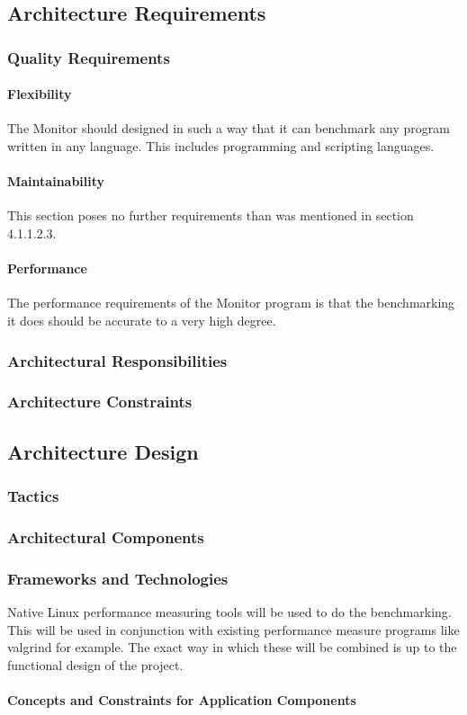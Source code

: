 
\subsection{Architecture Requirements}


\subsubsection{Quality Requirements}
\paragraph{Flexibility}
The Monitor should designed in such a way that it can benchmark any program
written in any language. This includes programming and scripting languages.

\paragraph{Maintainability}
This section poses no further requirements than was mentioned in
section 4.1.1.2.3.

\paragraph{Performance}
The performance requirements of the Monitor program is that the benchmarking
it does should be accurate to a very high degree.

\subsubsection{Architectural Responsibilities}


\subsubsection{Architecture Constraints}


\subsection{Architecture Design}
\subsubsection{Tactics}

\subsubsection{Architectural Components}

\subsubsection{Frameworks and Technologies}
Native Linux performance measuring tools will be used to do the benchmarking.
This will be used in conjunction with existing performance measure programs
like valgrind for example. The exact way in which these will be combined is
up to the functional design of the project.

\paragraph{Concepts and Constraints for Application Components}
